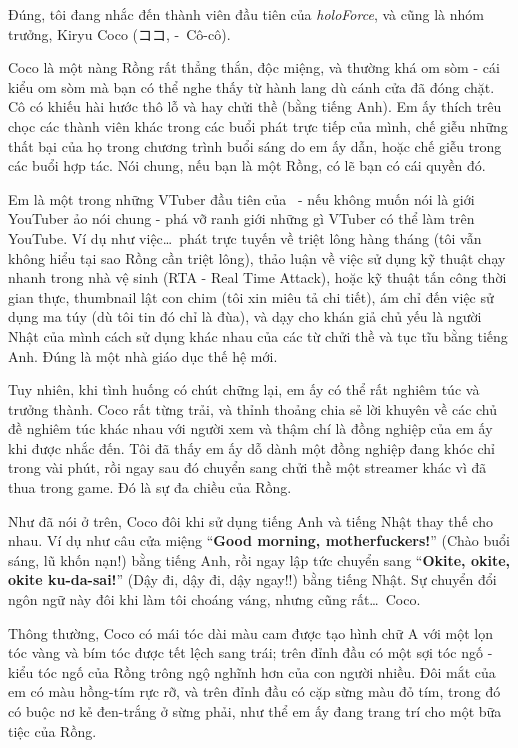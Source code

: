 \documentclass[../main.tex]{subfiles}
\begin{document}
\chrint

Đúng, tôi đang nhắc đến thành viên đầu tiên của \textit{holoForce}, và cũng là nhóm trưởng, Kiryu Coco (ココ, -\ Cô-cô).

Coco là một nàng Rồng rất thẳng thắn, độc miệng, và thường khá om sòm - cái kiểu om sòm mà bạn có thể nghe thấy từ hành lang dù cánh cửa đã đóng chặt. Cô có khiếu hài hước thô lỗ và hay chửi thề (bằng tiếng Anh). Em ấy thích trêu chọc các thành viên khác trong các buổi phát trực tiếp của mình, chế giễu những thất bại của họ trong chương trình buổi sáng do em ấy dẫn, hoặc chế giễu trong các buổi hợp tác. Nói chung, nếu bạn là một Rồng, có lẽ bạn có cái quyền đó.

Em là một trong những VTuber đầu tiên của \hll\ - nếu không muốn nói là giới YouTuber ảo nói chung - phá vỡ ranh giới những gì VTuber có thể làm trên YouTube. Ví dụ như việc\dots\ phát trực tuyến về triệt lông hàng tháng (tôi vẫn không hiểu tại sao Rồng cần triệt lông), thảo luận về việc sử dụng kỹ thuật chạy nhanh trong nhà vệ sinh (RTA - Real Time Attack), hoặc kỹ thuật tấn công thời gian thực, thumbnail lật con chim (tôi xin miêu tả chi tiết), ám chỉ đến việc sử dụng ma túy (dù tôi tin đó chỉ là đùa), và dạy cho khán giả chủ yếu là người Nhật của mình cách sử dụng khác nhau của các từ chửi thề và tục tĩu bằng tiếng Anh. Đúng là một nhà giáo dục thế hệ mới.


Tuy nhiên, khi tình huống có chút chững lại, em ấy có thể rất nghiêm túc và trưởng thành. Coco rất từng trải, và thỉnh thoảng chia sẻ lời khuyên về các chủ đề nghiêm túc khác nhau với người xem và thậm chí là đồng nghiệp của em ấy khi được nhắc đến. Tôi đã thấy em ấy dỗ dành một đồng nghiệp đang khóc chỉ trong vài phút, rồi ngay sau đó chuyển sang chửi thề một streamer khác vì đã thua trong game. Đó là sự đa chiều của Rồng.

Như đã nói ở trên, Coco đôi khi sử dụng tiếng Anh và tiếng Nhật thay thế cho nhau. Ví dụ như câu cửa miệng ``\textbf{Good morning, motherfuckers!}'' (Chào buổi sáng, lũ khốn nạn!) bằng tiếng Anh, rồi ngay lập tức chuyển sang ``\textbf{Okite, okite, okite ku-da-sai!}'' (Dậy đi, dậy đi, dậy ngay!!) bằng tiếng Nhật. Sự chuyển đổi ngôn ngữ này đôi khi làm tôi choáng váng, nhưng cũng rất\dots\ Coco.

Thông thường, Coco có mái tóc dài màu cam được tạo hình chữ A với một lọn tóc vàng và bím tóc được tết lệch sang trái; trên đỉnh đầu có một sợi tóc ngố - kiểu tóc ngố của Rồng trông ngộ nghĩnh hơn của con người nhiều. Đôi mắt của em có màu hồng-tím rực rỡ, và trên đỉnh đầu có cặp sừng màu đỏ tím, trong đó có buộc nơ kẻ đen-trắng ở sừng phải, như thể em ấy đang trang trí cho một bữa tiệc của Rồng.
\end{document}
